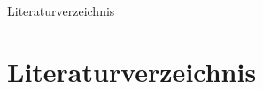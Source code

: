 \begin{frame}{Literaturverzeichnis}
\section{Literaturverzeichnis}
\printbibliography[heading=none]
\end{frame}